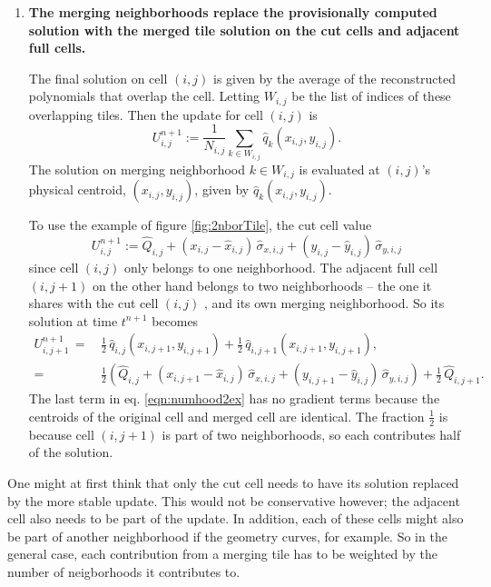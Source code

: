 \begin{enumerate}
\item
{\bf The merging neighborhoods replace the provisionally computed solution 
with the merged tile solution on the cut cells and adjacent full cells.} 

\vspace*{.1in}
The final solution on cell $(i,j)$ is given by the average of the 
reconstructed polynomials that overlap the cell. Letting $W_{i,j}$ be the list of
indices of these overlapping tiles. Then the update for cell $(i,j)$ is
\begin{equation} \label{eqn:final_update_linear}
U^{n+1}_{i,j} := \frac{1}{N_{i,j}}\sum_{k \in W_{i,j}}\hat{q}_{k}(x_{i,j},y_{i,j}).
\end{equation}
The solution on merging neighborhood $k \in W_{i,j}$ is evaluated at $(i,j)$'s 
physical centroid, $(x_{i,j},y_{i,j})$, given by $\hat{q}_{k}(x_{i,j},y_{i,j})$.  

To use the example of figure \ref{fig:2nborTile}, the cut cell value
\begin{equation}
   U_{i,j}^{n+1} := \widehat{Q}_{i,j} 
   + ( x_{i,j} - \widehat x_{i,j}) \, \widehat{\sigma}_{x,i,j}
   + ( y_{i,j} - \widehat y_{i,j}) \, \widehat{\sigma}_{y,i,j}
\end{equation}
since cell $(i,j)$ only belongs to one neighborhood. The adjacent full cell
$(i,j+1)$ on the other hand belongs to two neighborhoods -- the one it 
shares with
the cut cell $(i,j)$ , and its own merging neighborhood.
So its solution at time $t^{n+1}$  becomes
\begin{equation}
\label{eqn:numhood2ex}
\begin{split}
   U_{i,j+1}^{n+1} \,=\, & \frac{1}{2} \, \widehat{q}_{i,j}(x_{i,j+1},y_{i,j+1})+ 
   \frac{1}{2} \,  \widehat{q}_{i,j+1}(x_{i,j+1},y_{i,j+1}), \\
   = &\frac{1}{2} \left
   (\widehat{Q}_{i,j} 
   + ( x_{i,j+1} - \widehat x_{i,j}) \, \widehat{\sigma}_{x,i,j}
   + ( y_{i,j+1} - \widehat y_{i,j}) \, \widehat{\sigma}_{y,i,j} \right ) + 
   \frac{1}{2} \, \widehat{Q}_{i,j+1} .
\end{split}
\end{equation}
The last term  in eq. \eqref{eqn:numhood2ex} has no gradient terms because the
centroids of the original cell and merged cell are identical.
The fraction $\frac{1}{2}$ is because cell $(i,j+1)$ is part of  two
neighborhoods, so each contributes half of the solution.
\end{enumerate}

One might at first think that only the cut cell needs to have its solution replaced
by the more stable update.  This would not be conservative however; the adjacent cell
also needs to be part of the update. In addition, each of these cells might also be part of
another neighborhood if the geometry curves, for example. So in the general case,
each contribution from a merging tile has to be weighted by the number of
neigborhoods it contributes to. 


